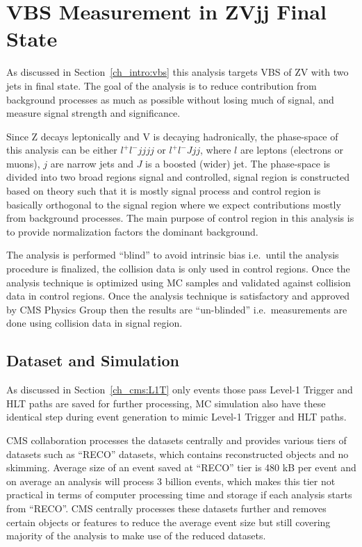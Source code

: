 \chapter{
  VBS Measurement in ZVjj Final State
 }\label{ch_vbs}

As discussed in Section~\ref{ch_intro:vbs} this analysis targets
\gls{VBS} of ZV with two jets in final state. The goal of the analysis
is to reduce contribution from background processes as much as possible
without losing much of signal, and measure signal strength and significance.

Since Z decays leptonically and V is decaying hadronically,
the phase-space of this analysis can be either
\( l^+ l^- jjjj \) or \( l^+ l^- J jj\), where \( l \) are leptons (electrons
or muons),
\( j \) are narrow jets and \( J \) is a boosted (wider) jet.
The phase-space is divided into two broad regions signal and controlled,
signal region is constructed based on theory such that it is mostly signal process
and control region is basically orthogonal to the signal region
where we expect contributions mostly from background processes.
The main purpose of control region
in this analysis is to
provide normalization factors the dominant background.

The analysis is performed ``blind'' to avoid intrinsic bias
i.e.\ until the analysis procedure is finalized, the collision data is only used
in control regions. Once the analysis technique is optimized using \gls{MC}
samples and validated against collision data in control regions. Once the
analysis technique is satisfactory and approved by \gls{CMS} Physics Group
then the results are ``un-blinded'' i.e.\ measurements are done
using collision data in signal region.

\section{
  Dataset and Simulation
 }

As discussed in Section~\ref{ch_cms:L1T} only events those pass Level-1
Trigger and \gls{HLT} paths are saved for further processing, \gls{MC}
simulation also have these identical step during event generation to mimic
Level-1 Trigger and \gls{HLT} paths.

\gls{CMS} collaboration processes the datasets centrally and provides various
tiers of datasets such as ``RECO'' datasets, which contains reconstructed
objects and no skimming. Average size of an event saved at ``RECO'' tier is
480 kB per event and on average an analysis will process
3 billion events, which makes this tier not practical in terms of computer processing
time and storage if each analysis starts from ``RECO''. \gls{CMS} centrally
processes these datasets further and removes certain objects
or features to reduce the average event size but still covering
majority of the analysis to make use of the reduced datasets.


